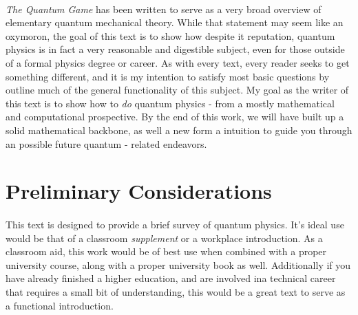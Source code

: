 \documentclass[12pt,letterpaper]{book}
\begin{document}
\paragraph*{}\textit{The Quantum Game} has been written to serve as a very broad overview of elementary quantum mechanical theory. While that statement may seem like an oxymoron, the goal of this text is to show how despite it reputation, quantum physics is in fact a very reasonable and digestible subject, even for those outside of a formal physics degree or career. As with every text, every reader seeks to get something different, and it is my intention to satisfy most basic questions  by outline much of the general functionality of this subject. My goal as the writer of this text is to show how to \textit{do} quantum physics - from a mostly mathematical and computational prospective. By the end of this work, we will have built up a solid mathematical backbone, as well a new form a intuition to guide you through an possible future quantum - related endeavors.

\vspace*{6cm}

\pagebreak


\section*{Preliminary Considerations}

\paragraph*{}This text is designed to provide a brief survey of quantum physics. It's ideal use would be that of a classroom \textit{supplement} or a workplace introduction. As a classroom aid, this work would be of best use when combined with a proper university course, along with a proper university book as well. Additionally if you have already finished a higher education, and are involved ina technical career that requires a small bit of understanding, this would be a great text to serve as a functional introduction.
\end{document}
